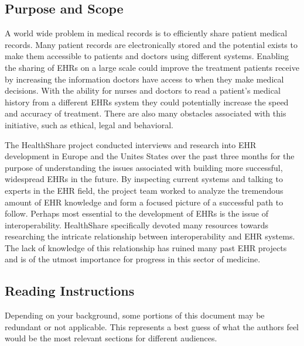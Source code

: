 \documentclass[14pt]{article}
\begin{document}



\subsection{Purpose and Scope}
A world wide problem in medical records is to efficiently share patient medical records. Many patient records are electronically stored and the potential exists to make them accessible to patients and doctors using different systems. Enabling the sharing of \glspl{EHR} on a large scale could improve the treatment patients receive by increasing the information doctors have access to when they make medical decisions. With the ability for nurses and doctors to read a patient's medical history from a different \glspl{EHR} system they could potentially increase the speed and accuracy of treatment. There are also many obstacles associated with this initiative, such as ethical, legal and behavioral.

The HealthShare project conducted interviews and research into \gls{EHR} development in Europe and the Unites States over the past three months for the purpose of understanding the issues associated with building more successful, widespread \glspl{EHR} in the future. By inspecting current systems and talking to experts in the \gls{EHR} field, the project team worked to analyze the tremendous amount of \gls{EHR} knowledge and form a focused picture of a successful path to follow. Perhaps most essential to the development of \glspl{EHR} is the issue of interoperability. HealthShare specifically devoted many resources towards researching the intricate relationship between interoperability and \gls{EHR} systems. The lack of knowledge of this relationship has ruined many past \gls{EHR} projects and is of the utmost importance for progress in this sector of medicine.


\subsection{Reading Instructions}
Depending on your background, some portions of this document may be redundant or not applicable. This represents a best guess of what the authors feel would be the most relevant sections for different audiences.
\end{document}
